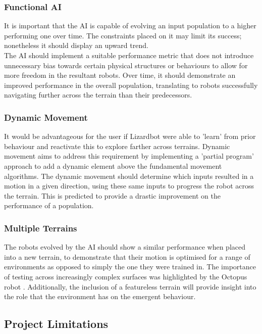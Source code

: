 \documentclass{article}
\begin{document}
\subsubsection{Functional AI}
\label{sec:Effective AI}
It is important that the AI is capable of evolving an input population to a higher performing one over time. The constraints placed on it may limit its success; nonetheless it should display an upward trend.\\ The AI should implement a suitable performance metric that does not introduce unnecessary bias towards certain physical structures or behaviours to allow for more freedom in the resultant robots. Over time, it should demonstrate an improved performance in the overall population, translating to robots successfully navigating further across the terrain than their predecessors. 

\subsubsection{Dynamic Movement}
\label{sec:Dynamic Movement Req}
It would be advantageous for the user if Lizardbot were able to 'learn' from prior behaviour and reactivate this to explore farther across terrains. Dynamic movement aims to address this requirement by implementing a 'partial program' approach  to add a dynamic element above the fundamental movement algorithms. The dynamic movement should determine which inputs resulted in a motion in a given direction, using these same inputs to progress the robot across the terrain. This is predicted to provide a drastic improvement on the performance of a population.

\subsubsection{Multiple Terrains}
\label{sec:Multiple Terrains}
The robots evolved by the AI should show a similar performance when placed into a new terrain, to demonstrate that their motion is optimised for a range of environments as opposed to simply the one they were trained in. The importance of testing across increasingly complex surfaces was highlighted by the Octopus robot . Additionally, the inclusion of a featureless terrain will provide insight into the role that the environment has on the emergent behaviour. 

\subsection{Project Limitations}
\label{sec:Non-functional Requirements}
\end{document}
